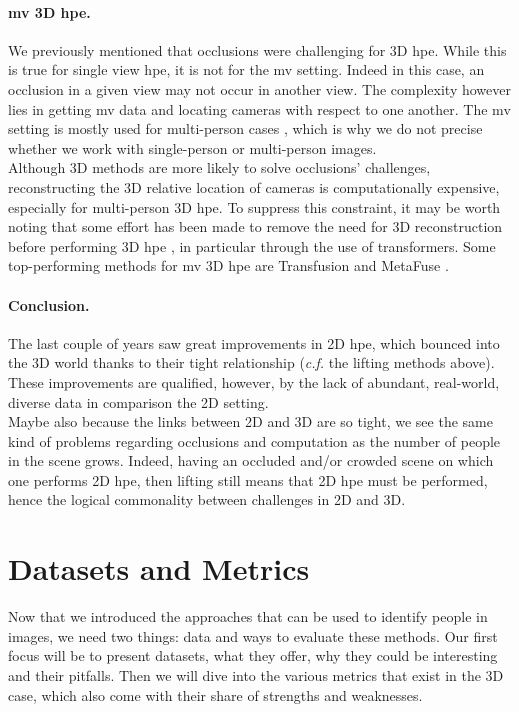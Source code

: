 \documentclass[runningheads]{llncs}
\begin{document}
\paragraph{\ac{mv} 3D \ac{hpe}.}
We previously mentioned that occlusions were challenging for 3D \ac{hpe}. While this is true for single view \ac{hpe}, it is not for the \ac{mv} setting. Indeed in this case, an occlusion in a given view may not occur in another view. The complexity however lies in getting \ac{mv} data and locating cameras with respect to one another. The \ac{mv} setting is mostly used for multi-person cases \cite{survey}, which is why we do not precise whether we work with single-person or multi-person images. \\
Although 3D methods are more likely to solve occlusions' challenges, reconstructing the 3D relative location of cameras is computationally expensive, especially for multi-person 3D \ac{hpe}. To suppress this constraint, it may be worth noting that some effort has been made to remove the need for 3D reconstruction before performing 3D \ac{hpe} \cite{Multi-view Pose transformer}, in particular through the use of transformers. Some top-performing methods for \ac{mv} 3D \ac{hpe} are Transfusion \cite{Transfusion} and MetaFuse \cite{MetaFuse}.

\paragraph{Conclusion.} The last couple of years saw great improvements in 2D \ac{hpe}, which bounced into the 3D world thanks to their tight relationship (\textit{c.f.} the lifting methods above). These improvements are qualified, however, by the lack of abundant, real-world, diverse data in comparison the 2D setting. \\
Maybe also because the links between 2D and 3D are so tight, we see the same kind of problems regarding occlusions and computation as the number of people in the scene grows. Indeed, having an occluded and/or crowded scene on which one performs 2D \ac{hpe}, then lifting still means that 2D \ac{hpe} must be performed, hence the logical commonality between challenges in 2D and 3D.

\section{Datasets and Metrics}
Now that we introduced the approaches that can be used to identify people in images, we need two things: data and ways to evaluate these methods. Our first focus will be to present datasets, what they offer, why they could be interesting and their pitfalls. Then we will dive into the various metrics that exist in the 3D case, which also come with their share of strengths and weaknesses.
\end{document}
